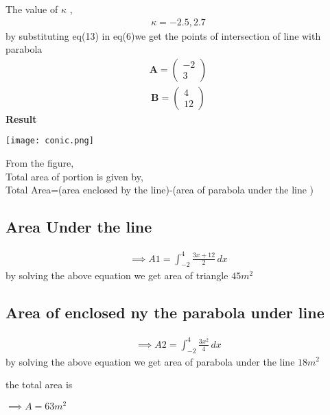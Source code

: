 \documentclass[10pt,a4paper]{report}
\newcommand{\myvec}[1]{\ensuremath{\begin{pmatrix}#1\end{pmatrix}}}
\let\vec\mathbf
\let\vec\mathbf
\begin{document}
\begin{multicols}{2}
The value of $\kappa$ ,\\
\begin{align}
    \kappa =-2.5,2.7
\end{align}
by substituting eq(13) in eq(6)we get the
points of intersection of line with parabola \\
\begin{align}
    \vec{A}=\myvec{
-2\\
3
    }
\end{align}
\begin{align}
    \vec{B}=\myvec{
4\\
12
    }
\end{align}
\textbf{Result}
\begin{center}
 \texttt{[image: conic.png]}    
 \end{center}\vspace{1mm}
 From the figure,\\ \vspace{1mm}
Total area of portion is given by, \\ \vspace{1mm}
Total Area=(area enclosed by the line)-(area of parabola under the line )

\subsection*{Area Under the line}

\begin{align}
\implies A1=\int_{-2}^{4} \frac{3x+12}{2} \,dx
\end{align}
by solving the above equation we get area of triangle \textbf{$45 m^2$}
\subsection*{Area of enclosed ny the parabola under line}

\begin{align} 
\implies A2=\int_{-2}^{4}\frac{3x^2}{4} \,dx 
\end{align}
by solving the above equation we get area of parabola under the line \textbf{$18 m^2$}

the total area is

\vspace{3mm}
$\implies A=63 m^2 $\vspace{3mm}


\end{multicols}
\end{document}
